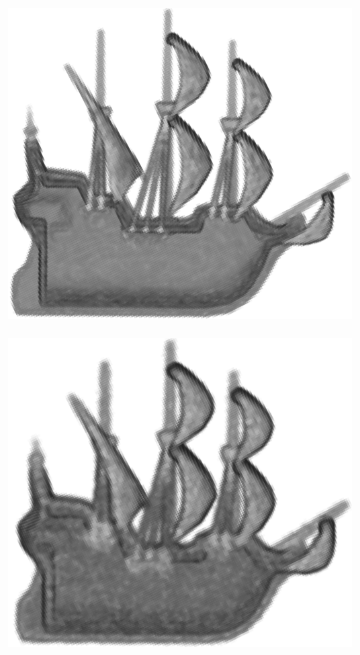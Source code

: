\begin{figure}[ht]
	\centering
	\begin{subfigure}[t]{0.33\linewidth}\centering
		\includegraphics[width=1\linewidth]{./fig/eval/noise_none.png}
		\label{fig/eval/noise_none}
	\end{subfigure}
	\begin{subfigure}[t]{0.33\linewidth}\centering
		\includegraphics[width=1\linewidth]{./fig/eval/noise_low.png}

\end{subfigure}
\end{figure}
